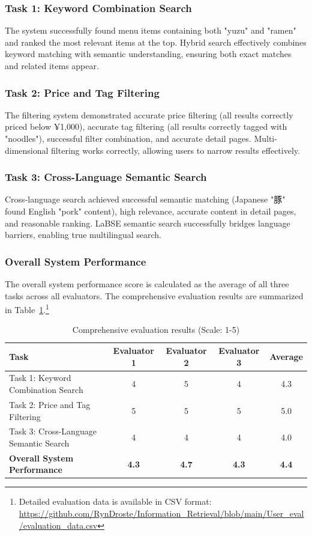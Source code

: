 \documentclass[11pt,a4paper]{article}
\begin{document}
\subsubsection{Task 1: Keyword Combination Search}

The system successfully found menu items containing both "yuzu" and "ramen" and ranked the most relevant items at the top. Hybrid search effectively combines keyword matching with semantic understanding, ensuring both exact matches and related items appear.

\subsubsection{Task 2: Price and Tag Filtering}

The filtering system demonstrated accurate price filtering (all results correctly priced below ¥1,000), accurate tag filtering (all results correctly tagged with "noodles"), successful filter combination, and accurate detail pages. Multi-dimensional filtering works correctly, allowing users to narrow results effectively.

\subsubsection{Task 3: Cross-Language Semantic Search}

Cross-language search achieved successful semantic matching (Japanese "豚" found English "pork" content), high relevance, accurate content in detail pages, and reasonable ranking. LaBSE semantic search successfully bridges language barriers, enabling true multilingual search.

\subsubsection{Overall System Performance}

The overall system performance score is calculated as the average of all three tasks across all evaluators. The comprehensive evaluation results are summarized in Table~\ref{tab:evaluation_results}.\footnote{Detailed evaluation data is available in CSV format: \url{https://github.com/RynDroste/Information_Retrieval/blob/main/User_eval/evaluation_data.csv}}

\begin{table}[H]
\centering
\begin{tabular}{@{}lcccc@{}}
\toprule
\textbf{Task} & \textbf{Evaluator 1} & \textbf{Evaluator 2} & \textbf{Evaluator 3} & \textbf{Average} \\
\midrule
Task 1: Keyword Combination Search & 4 & 5 & 4 & 4.3 \\
Task 2: Price and Tag Filtering & 5 & 5 & 5 & 5.0 \\
Task 3: Cross-Language Semantic Search & 4 & 4 & 4 & 4.0 \\
\midrule
\textbf{Overall System Performance} & \textbf{4.3} & \textbf{4.7} & \textbf{4.3} & \textbf{4.4} \\
\bottomrule
\end{tabular}
\caption{Comprehensive evaluation results (Scale: 1-5)}
\label{tab:evaluation_results}
\end{table}
\end{document}

